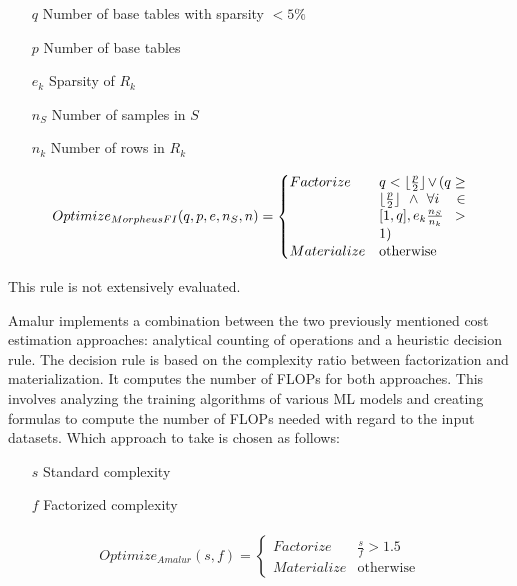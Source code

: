 \begin{definition}
    \begin{itemize}
        \item[]
        \item[$q$]Number of base tables with sparsity $ < 5\% $
        \item[$p$] Number of base tables
        \item[$e_k$] Sparsity of $R_k$
        \item[$n_S$] Number of samples in $S$
        \item[$n_k$] Number of rows in $R_k$
    \end{itemize}

    \begin{align*}
        \begin{split}
            Optimize_{MorpheusFI}(q, p, e, n_S, n) =
            \begin{cases}
                Factorize   & \parbox[t]{.18\linewidth}{$q < \lfloor \frac{p}{2} \rfloor \vee ( q \geq \lfloor \frac{p}{2} \rfloor \wedge \forall i \in [1,q], e_k \frac{n_S}{n_k} > 1)$} \\
                Materialize & \text{otherwise}
            \end{cases}
        \end{split}
    \end{align*}
\end{definition}

This rule is not extensively evaluated.

Amalur \cite{schijndel_cost_estimation} implements a combination between the two previously mentioned cost estimation approaches: analytical counting of operations and a heuristic decision rule. The decision rule is based on the complexity ratio between factorization and materialization. It computes the number of FLOPs for both approaches. This involves analyzing the training algorithms of various ML models and creating formulas to compute the number of FLOPs needed with regard to the input datasets. Which approach to take is chosen as follows:

\begin{definition}

    \begin{itemize}
        \item[]
        \item[$s$] Standard complexity
        \item[$f$] Factorized complexity
    \end{itemize}

    \begin{align*}
        \begin{split}
            Optimize_{Amalur}(s, f) =
            \begin{cases}
                Factorize   & \frac{s}{f} > 1.5 \\
                Materialize & \text{otherwise}
            \end{cases}
        \end{split}
    \end{align*}
\end{definition}

